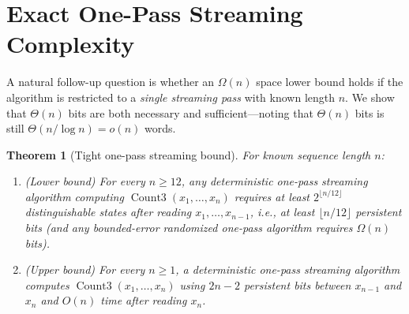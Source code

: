 \documentclass[11pt]{article}
\theoremstyle{plain}
\newtheorem{theorem}{Theorem}
\theoremstyle{definition}
\theoremstyle{remark}
\DeclareMathOperator{\CountThree}{Count3}
\begin{document}
\section{Exact One-Pass Streaming Complexity}

A natural follow-up question is whether an $\Omega(n)$ space lower bound holds if the algorithm is restricted to a \emph{single streaming pass} with known length $n$. We show that $\Theta(n)$ bits are both necessary and sufficient---noting that $\Theta(n)$ bits is still $\Theta(n/\log n) = o(n)$ words.

\begin{theorem}[Tight one-pass streaming bound]\label{thm:streaming}
For known sequence length $n$:
\begin{enumerate}[label=\textup{(\arabic*)}]
\item \emph{(Lower bound)} For every $n \ge 12$, any deterministic one-pass streaming algorithm computing $\CountThree(x_1, \dots, x_n)$ requires at least $2^{\lfloor n/12 \rfloor}$ distinguishable states after reading $x_1, \dots, x_{n-1}$, i.e., at least $\lfloor n/12 \rfloor$ persistent bits (and any bounded-error randomized one-pass algorithm requires $\Omega(n)$ bits).
\item \emph{(Upper bound)} For every $n \ge 1$, a deterministic one-pass streaming algorithm computes $\CountThree(x_1, \dots, x_n)$ using $2n - 2$ persistent bits between $x_{n-1}$ and $x_n$ and $O(n)$ time after reading $x_n$.
\end{enumerate}
\end{theorem}
\end{document}
